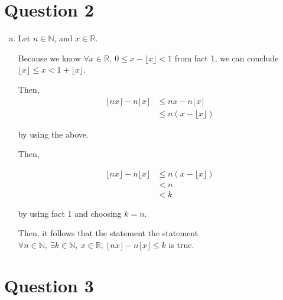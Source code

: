 \documentclass[12pt]{article}
\begin{document}
\section*{Question 2}

\begin{enumerate}[a.]
    \item

    Let $n \in \mathbb{N}$, and $x \in \mathbb{R}$.

    \bigskip

    Because we know $\forall x \in \mathbb{R},\: 0 \leq x - \lfloor x \rfloor < 1$ from
    fact 1, we can conclude $\lfloor x \rfloor \leq x < 1 + \lfloor x \rfloor$.

    \bigskip

    Then,
    \setcounter{equation}{0}
    \begin{align}
        \lfloor nx \rfloor - n \lfloor x \rfloor &\leq nx - n\lfloor x \rfloor\\
        &\leq n(x - \lfloor x \rfloor)
    \end{align}

    by using the above.

    \bigskip

    Then,

    \begin{align}
        \lfloor nx \rfloor - n \lfloor x \rfloor &\leq n(x - \lfloor x \rfloor)\\
        &< n\\
        &< k
    \end{align}

    by using fact 1 and choosing $k = n$.

    \bigskip

    Then, it follows that the statement the statement
    $\forall n \in \mathbb{N},\:\exists k \in \mathbb{N},\:x \in \mathbb{R},\:\lfloor
    nx \rfloor - n \lfloor x \rfloor \leq k$ is true.



\end{enumerate}

\section*{Question 3}
\end{document}
